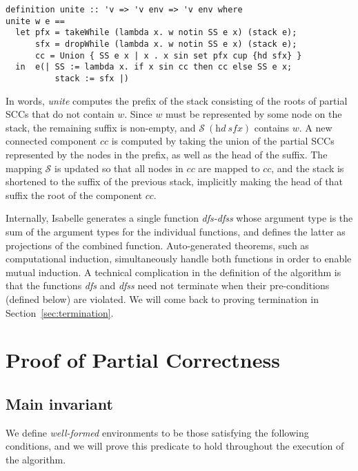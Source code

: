 \documentclass[sigplan,10pt,anonymous,review]{acmart}
\newcommand{\prog}[1]{\textit{#1}}
\renewcommand{\SS}{\mathcal{S}}
\begin{document}
\begin{small}
\begin{lstlisting}[language=isabelle]
definition unite :: 'v => 'v env => 'v env where
unite w e ==
  let pfx = takeWhile (lambda x. w notin SS e x) (stack e);
      sfx = dropWhile (lambda x. w notin SS e x) (stack e);
      cc = Union { SS e x | x . x sin set pfx cup {hd sfx} }
  in  e(| SS := lambda x. if x sin cc then cc else SS e x;
          stack := sfx |)
\end{lstlisting}
\end{small}

In words, \prog{unite} computes the prefix of the stack consisting of the roots of partial SCCs that do not contain $w$. Since $w$ must be represented by some node on the stack, the remaining suffix is non-empty, and $\SS~(\prog{hd}~\prog{sfx})$ contains $w$. A new connected component $\prog{cc}$ is computed by taking the union of the partial SCCs represented by the nodes in the prefix, as well as the head of the suffix. The mapping $\SS$ is updated so that all nodes in $\prog{cc}$ are mapped to $\prog{cc}$, and the stack is shortened to the suffix of the previous stack, implicitly making the head of that suffix the root of the component $cc$.

Internally, Isabelle generates a single function \prog{dfs-dfss} whose argument type is the sum of the argument types for the individual functions, and defines the latter as projections of the combined function. Auto-generated theorems, such as computational induction, simultaneously handle both functions in order to enable mutual induction. A technical complication in the definition of the algorithm is that the functions \prog{dfs} and \prog{dfss} need not terminate when their pre-conditions (defined below) are violated. We will come back to proving termination in Section~\ref{sec:termination}.


\section{Proof of Partial Correctness}
\label{sec:partial-correctness}

\subsection{Main invariant}
\label{sec:invariant}

We define \emph{well-formed} environments to be those satisfying the following conditions, and we will prove this predicate to hold throughout the execution of the algorithm.
\end{document}
